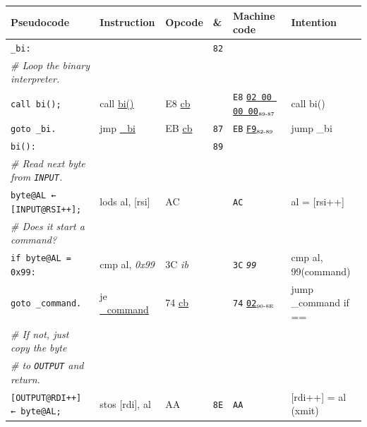 \documentclass[a4paper,12pt,final]{article}
\begin{document}
\begin{table}[!htbp] \begin{adjustwidth}{-1cm}{-1cm} \fontsize{10}{12.000000}\selectfont
\begin{center}
\begin{tabular}{l|ll|l|lH}
\textbf{Pseudocode} & \textbf{Instruction} & \textbf{Opcode} & \textbf{\&} & \textbf{Machine code} & \textbf{Intention}\\[0pt]
\hline
\texttt{\_bi:} &  &  & \texttt{82} &  & \\[0pt]
\hspace{1em} \emph{\# Loop the binary interpreter.} &  &  &  &  & \\[0pt]
\hspace{1em} \texttt{call bi();} & call \uline{bi()} & E8 \uline{cb}\footnotemark &  & \texttt{E8} \uline{\texttt{02 00 00 00}}​\(_{\text{\tiny 89-87}}\) & call bi()\\[0pt]
\hspace{1em} \texttt{goto \_bi.} & jmp \uline{\_bi} & EB \uline{cb} & \texttt{87} & \texttt{EB} \uline{\texttt{F9}}​\(_{\text{\tiny 82-89}}\) & jump \_bi\\[0pt]
\texttt{bi():} &  &  & \texttt{89} &  & \\[0pt]
\hspace{1em} \emph{\# Read next byte from \texttt{INPUT}.} &  &  &  &  & \\[0pt]
\hspace{1em} \texttt{byte@AL ← [INPUT@RSI++];} & lods al, [rsi] & AC &  & \texttt{AC} & al = [rsi++]\\[0pt]
\hspace{1em} \emph{\# Does it start a command?} &  &  &  &  & \\[0pt]
\hspace{1em} \texttt{if byte@AL = 0x99:} & cmp al, \emph{0x99} & 3C \emph{ib} &  & \texttt{3C} \emph{\texttt{99}} & cmp al, 99(command)\\[0pt]
\hspace{2em}     \texttt{goto \_command.} & je \uline{\_command} & 74 \uline{cb} &  & \texttt{74} \uline{\texttt{02}}​\(_{\text{\tiny 90-8E}}\) & jump \_command if ==\\[0pt]
\hspace{1em} \emph{\# If not, just copy the byte} &  &  &  &  & \\[0pt]
\hspace{1em} \emph{\# to \texttt{OUTPUT} and return.} &  &  &  &  & \\[0pt]
\hspace{1em} \texttt{[OUTPUT@RDI++] ← byte@AL;} & stos [rdi], al & AA & \texttt{8E} & \texttt{AA} & [rdi++] = al (xmit)\\[0pt]

\end{tabular}
\end{center}
\end{adjustwidth}
\end{table}
\end{document}
